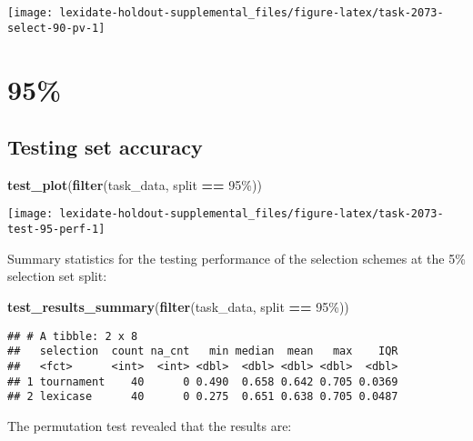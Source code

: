 \documentclass[
]{book}
\newenvironment{Shaded}{\begin{snugshade}}{\end{snugshade}}
\newcommand{\FunctionTok}[1]{\textcolor[rgb]{0.13,0.29,0.53}{\textbf{#1}}}
\newcommand{\NormalTok}[1]{#1}
\newcommand{\SpecialCharTok}[1]{\textcolor[rgb]{0.81,0.36,0.00}{\textbf{#1}}}
\newcommand{\StringTok}[1]{\textcolor[rgb]{0.31,0.60,0.02}{#1}}
\begin{document}
\texttt{[image: lexidate-holdout-supplemental\_files/figure-latex/task-2073-select-90-pv-1]}

\hypertarget{section-44}{%
\section{95\%}\label{section-44}}

\hypertarget{testing-set-accuracy-44}{%
\subsection{Testing set accuracy}\label{testing-set-accuracy-44}}

\begin{Shaded}
\begin{Highlighting}[]
\FunctionTok{test\_plot}\NormalTok{(}\FunctionTok{filter}\NormalTok{(task\_data, split }\SpecialCharTok{==} \StringTok{\textquotesingle{}95\%\textquotesingle{}}\NormalTok{))}
\end{Highlighting}
\end{Shaded}

\texttt{[image: lexidate-holdout-supplemental\_files/figure-latex/task-2073-test-95-perf-1]}

Summary statistics for the testing performance of the selection schemes at the 5\% selection set split:

\begin{Shaded}
\begin{Highlighting}[]
\FunctionTok{test\_results\_summary}\NormalTok{(}\FunctionTok{filter}\NormalTok{(task\_data, split }\SpecialCharTok{==} \StringTok{\textquotesingle{}95\%\textquotesingle{}}\NormalTok{))}
\end{Highlighting}
\end{Shaded}

\begin{verbatim}
## # A tibble: 2 x 8
##   selection  count na_cnt   min median  mean   max    IQR
##   <fct>      <int>  <int> <dbl>  <dbl> <dbl> <dbl>  <dbl>
## 1 tournament    40      0 0.490  0.658 0.642 0.705 0.0369
## 2 lexicase      40      0 0.275  0.651 0.638 0.705 0.0487
\end{verbatim}

The permutation test revealed that the results are:
\end{document}
